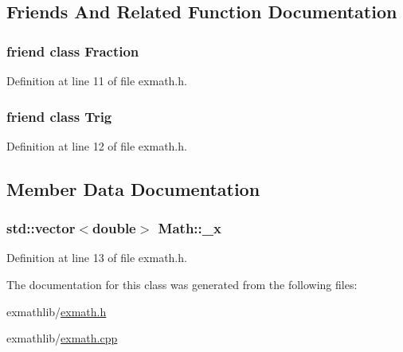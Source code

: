 \subsection{Friends And Related Function Documentation}
\subsubsection[{\texorpdfstring{Fraction}{Fraction}}]{\setlength{\rightskip}{0pt plus 5cm}friend class {\bf Fraction}\hspace{0.3cm}{\ttfamily [friend]}}\hypertarget{class_math_ac61a95a43ace8521281eb9a7f4c14b88}{}\label{class_math_ac61a95a43ace8521281eb9a7f4c14b88}


Definition at line 11 of file exmath.\+h.

\subsubsection[{\texorpdfstring{Trig}{Trig}}]{\setlength{\rightskip}{0pt plus 5cm}friend class {\bf Trig}\hspace{0.3cm}{\ttfamily [friend]}}\hypertarget{class_math_a4736ea1f14879a304bb656865c08e97e}{}\label{class_math_a4736ea1f14879a304bb656865c08e97e}


Definition at line 12 of file exmath.\+h.



\subsection{Member Data Documentation}
\subsubsection[{\texorpdfstring{\+\_\+x}{_x}}]{\setlength{\rightskip}{0pt plus 5cm}std\+::vector$<$double$>$ Math\+::\+\_\+x}\hypertarget{class_math_a414ad22921de6ac30c3002770c6cadf2}{}\label{class_math_a414ad22921de6ac30c3002770c6cadf2}


Definition at line 13 of file exmath.\+h.



The documentation for this class was generated from the following files\+:\begin{DoxyCompactItemize}
\item 
exmathlib/\hyperlink{exmath_8h}{exmath.\+h}\item 
exmathlib/\hyperlink{exmath_8cpp}{exmath.\+cpp}\end{DoxyCompactItemize}
